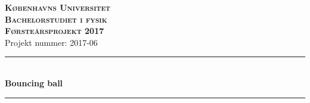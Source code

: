 \documentclass[12pt,oneside,a4paper]{article}
\numberwithin{equation}{section}
\begin{document}

\begin{center}
{\textsc {\LARGE \bf{Københavns Universitet \\[0.3cm]  Bachelorstudiet i fysik}}}\\[1.5cm]
{\textsc {\Large \bf Førsteårsprojekt 2017}}\\[0.8cm]
{\Large Projekt nummer: 2017-06}\\[1cm]

\rule{15cm}{0.01cm}\\[1cm]
{\LARGE\bf  Bouncing ball}\\ [0.5cm]
\rule{15cm}{0.01cm}\\[1cm]
\end{center}
\end{document}
